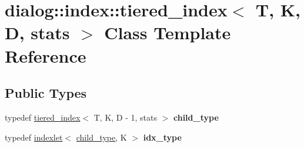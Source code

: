 \hypertarget{classdialog_1_1index_1_1tiered__index}{}\section{dialog\+:\+:index\+:\+:tiered\+\_\+index$<$ T, K, D, stats $>$ Class Template Reference}
\label{classdialog_1_1index_1_1tiered__index}
\subsection*{Public Types}
\begin{DoxyCompactItemize}
\item 
\mbox{\label{classdialog_1_1index_1_1tiered__index_afb4ce4f2ba6d376549294eff5732ed52}} 
typedef \hyperlink{classdialog_1_1index_1_1tiered__index}{tiered\+\_\+index}$<$ T, K, D -\/ 1, stats $>$ {\bfseries child\+\_\+type}
\item 
\mbox{\label{classdialog_1_1index_1_1tiered__index_a2e1ed20ae7f61676e6b4015845a3ea5f}} 
typedef \hyperlink{classdialog_1_1index_1_1indexlet}{indexlet}$<$ \hyperlink{classdialog_1_1index_1_1tiered__index}{child\+\_\+type}, K $>$ {\bfseries idx\+\_\+type}
\end{DoxyCompactItemize}
